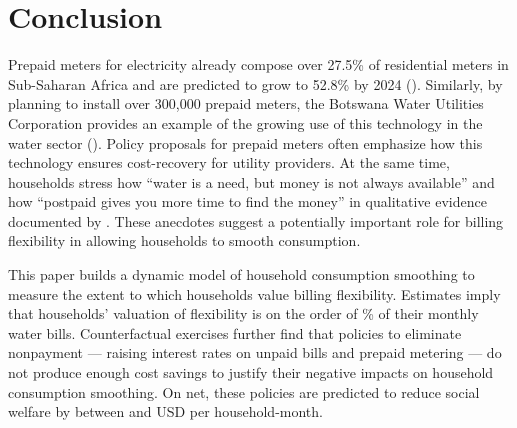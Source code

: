 \documentclass[12pt,table]{article}
\begin{document}

\section{Conclusion}\label{section:conclusion}

Prepaid meters for electricity already compose over 27.5\% of residential meters in Sub-Saharan Africa and are predicted to grow to 52.8\% by 2024 (\cite{northeast2014}).  Similarly, by planning to install over 300,000 prepaid meters, the Botswana Water Utilities Corporation provides an example of the growing use of this technology in the water sector (\cite{heymans2014limits}).  Policy proposals for prepaid meters often emphasize how this technology ensures cost-recovery for utility providers.  At the same time, households stress how ``water is a need, but money is not always available'' and  how ``postpaid gives you more time to find the money'' in qualitative evidence documented by \cite{heymans2014limits}.  These anecdotes suggest a potentially important role for billing flexibility in allowing households to smooth consumption.  

This paper builds a dynamic model of household consumption smoothing to measure the extent to which households value billing flexibility.  Estimates imply that households' valuation of flexibility is on the order of \unskip\% of their monthly water bills.  Counterfactual exercises further find that policies to eliminate nonpayment --- raising interest rates on unpaid bills and prepaid metering --- do not produce enough cost savings to justify their negative impacts on household consumption smoothing.  On net, these policies are predicted to reduce social welfare by between and USD per household-month.  
\end{document}
